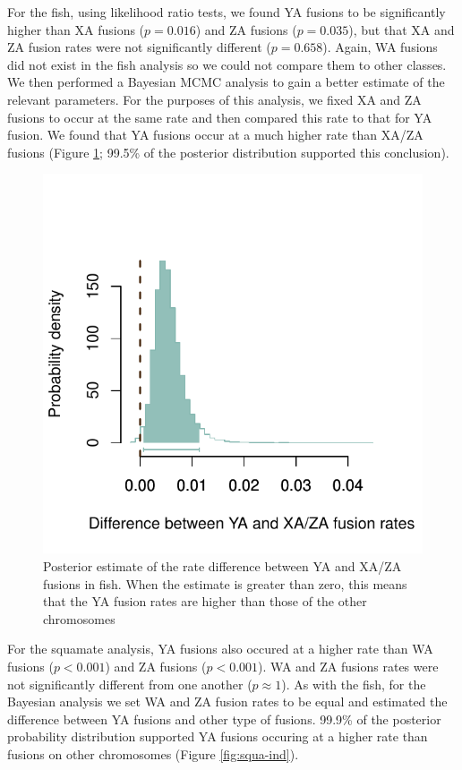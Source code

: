\documentclass[12pt,twoside]{article}
\begin{document}
For the fish, using likelihood ratio tests, we found YA fusions to be significantly higher than XA fusions ($p=\text{0.016}$) and ZA fusions ($p=\text{0.035}$), but that XA and ZA fusion rates were not significantly different ($p=\text{0.658}$). Again, WA fusions did not exist in the fish analysis so we could not compare them to other classes. We then performed a Bayesian MCMC analysis to gain a better estimate of the relevant parameters. For the purposes of this analysis, we fixed XA and ZA fusions to occur at the same rate and then compared this rate to that for YA fusion. We found that YA fusions occur at a much higher rate than XA/ZA fusions (Figure \ref{fig:fish-ind}; 99.5\% of the posterior distribution supported this conclusion).

\begin{figure}[p]
\centering
\includegraphics[scale=1.25]{figs/chromosome-fusion-fish}
\caption{Posterior estimate of the rate difference between YA and XA/ZA fusions in fish. When the estimate is greater than zero, this means that the YA fusion rates are higher than those of the other chromosomes}
\label{fig:fish-ind}
\end{figure}

For the squamate analysis, YA fusions also occured at a higher rate than WA fusions ($p<\text{0.001}$) and ZA fusions ($p<\text{0.001}$). WA and ZA fusions rates were not significantly different from one another ($p\approx \text{1}$). As with the fish, for the Bayesian analysis we set WA and ZA fusion rates to be equal and estimated the difference between YA fusions and other type of fusions. 99.9\% of the posterior probability distribution supported YA fusions occuring at a higher rate than fusions on other chromosomes (Figure \ref{fig:squa-ind}). 
\end{document}
